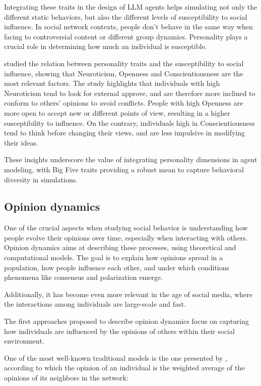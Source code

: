 \medskip
Integrating these traits in the design of LLM agents helps simulating not only the different static behaviors, but also the different levels of susceptibility to social influence.
In social network contexts, people don't behave in the same way when facing to controversial content or different group dynamics.
Personality plays a crucial role in determining how much an individual is susceptible.

\medskip
\citet{oyibo2019personality} studied the relation between personality traits and the susceptibility to social influence, showing that Neuroticism, Openness and Conscientiousness are the most relevant factors.
The study highlights that individuals with high Neuroticism tend to look for external approve, and are therefore more inclined to conform to others' opinions to avoid conflicts.
People with high Openness are more open to accept new or different points of view, resulting in a higher susceptibility to influence.
On the contrary, individuals high in Conscientiousness tend to think before changing their views, and are less impulsive in modifying their ideas.

\medskip
These insights underscore the value of integrating personality dimensions in agent modeling, with Big Five traits providing a robust mean to capture behavioral diversity in simulations.




\subsection{Opinion dynamics}
One of the crucial aspects when studying social behavior is understanding how people evolve their opinions over time, especially when interacting with others.
Opinion dynamics aims at describing these processes, using theoretical and computational models.
The goal is to explain how opinions spread in a population, how people influence each other, and under which conditions phenomena like consensus and polarization emerge.

Additionally, it has become even more relevant in the age of social media, where the interactions among individuals are large-scale and fast.


\medskip
The first approaches proposed to describe opinion dynamics focus on capturing how individuals are influenced by the opinions of others within their social environment.

One of the most well-known traditional models is the one presented by \citet{Degroot1974}, according to which the opinion of an individual is the weighted average of the opinions of its neighbors in the network:

